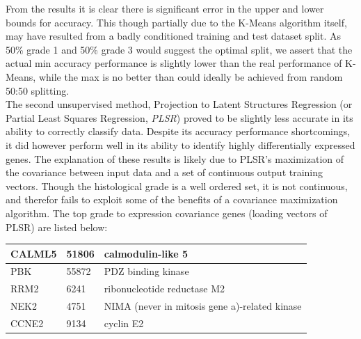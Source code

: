 \documentclass[a4paper,10pt]{article}
\begin{document}
From the results it is clear there is significant error in the upper and lower bounds for accuracy. This though partially due to the K-Means algorithm
itself, may have resulted from a badly conditioned training and test dataset split. As 50\% grade 1 and 50\% grade 3 would suggest the optimal split,
we assert that the actual min accuracy performance is slightly lower than the real performance of K-Means, while the max is no better than could
ideally be achieved from random 50:50 splitting.\\

The second unsupervised method, Projection to Latent Structures Regression (or Partial Least Squares Regression, \emph{PLSR})\cite{Wold1} proved to 
be slightly less accurate in its ability to correctly classify data. Despite its accuracy performance shortcomings, it did however
perform well in its ability to identify highly differentially expressed genes. The explanation of these results is likely due to PLSR's maximization of the covariance
between input data and a set of continuous output training vectors. Though the histological grade is a well ordered set, it is not continuous, and therefor fails to
exploit some of the benefits of a covariance maximization algorithm. The top grade to expression covariance genes (loading vectors of PLSR) are listed below:
\begin{center}
\begin{tabular}{| l | l | l |}
\hline
CALML5 & 51806 & calmodulin-like 5\\ \hline
PBK & 55872 & PDZ binding kinase\\ \hline
RRM2 & 6241 & ribonucleotide reductase M2\\ \hline
NEK2 & 4751 & NIMA (never in mitosis gene a)-related kinase\\ \hline
CCNE2 & 9134 & cyclin E2 \\ \hline
 \end{tabular}
\end{center}



\end{document}
